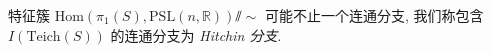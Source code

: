 
\begin{definition}
    特征簇 $\mathrm{Hom}(\pi_1(S), \mathrm{PSL}(n,\mathbb{R}))\sslash\sim$ 可能不止一个连通分支, 
    我们称包含 $I(\mathrm{Teich}(S))$ 的连通分支为 \emph{Hitchin 分支}.
\end{definition}

